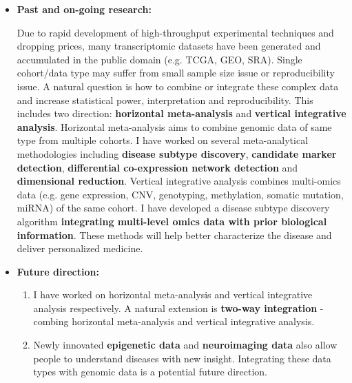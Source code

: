 \documentclass[a4paper, 10pt]{article}
\begin{document}
\begin{itemize}
\item \textbf{Past and on-going research:}

Due to rapid development of high-throughput experimental techniques and dropping prices, many transcriptomic datasets have
been generated and accumulated in the public domain (e.g. TCGA, GEO, SRA).
Single cohort/data type may suffer from small sample size issue or reproducibility issue.
A natural question is how to combine or integrate these complex data and increase statistical power, interpretation and reproducibility.
This includes two direction: \textbf{horizontal meta-analysis} and \textbf{vertical integrative analysis}. 
Horizontal meta-analysis aims to combine genomic data of same type from multiple cohorts.
I have worked on several meta-analytical methodologies including 
\textbf{disease subtype discovery}\cite{ref:MSKM}, 
\textbf{candidate marker detection}\cite{ref:BayesMP},
\textbf{differential co-expression network detection}\cite{ref:metaDCN}
and \textbf{dimensional reduction}\cite{ref:metaPCA}.
Vertical integrative analysis combines multi-omics data 
(e.g. gene expression, CNV, genotyping, methylation, somatic mutation, miRNA) of the same cohort.
I have developed a disease subtype discovery algorithm \textbf{integrating multi-level omics data with prior biological information}\cite{ref:ISKmeans}.
These methods will help better characterize the disease and deliver personalized medicine.

\item \textbf{Future direction:}
\begin{enumerate}
\item I have worked on horizontal meta-analysis and vertical integrative analysis respectively. 
A natural extension is \textbf{two-way integration} - combing horizontal meta-analysis and vertical integrative analysis. 
\item 
Newly innovated \textbf{epigenetic data} and \textbf{neuroimaging data} also allow people to understand diseases with new insight.
Integrating these data types with genomic data is a potential future direction.
\end{enumerate}

\end{itemize}
\end{document}
